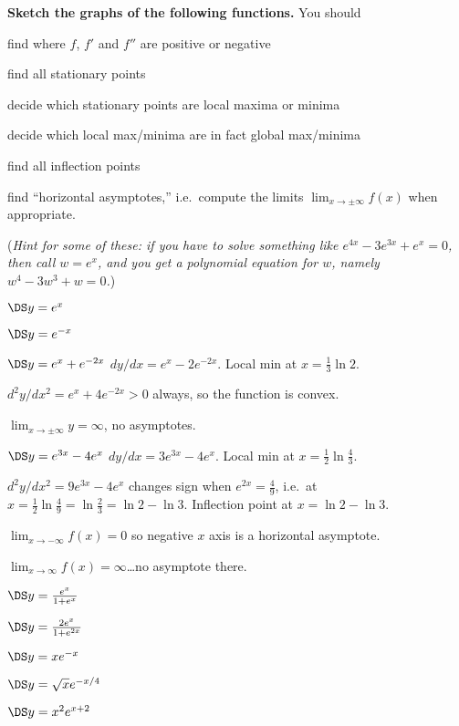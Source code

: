 \begin{multicols}{2}
\noindent\textbf{Sketch the graphs of the following functions.}
You should
\begin{list}{--}{
    \setlength{\itemindent}{0pt}
    \setlength{\leftmargin}{6pt}}
\item find where $f$, $f'$ and $f''$ are positive or negative
\item find all stationary points
\item decide which stationary points are local maxima or minima
\item decide which local max/minima are in fact global max/minima
\item find all inflection points
\item find ``horizontal asymptotes,'' i.e.\ compute the limits
  $\lim_{x\to\pm\infty}f(x)$ when appropriate.
\end{list}


(\textit{Hint for some of these:  if you have to solve something like
  $e^{4x}-3e^{3x}+e^x = 0$, then call $w=e^x$, and you get a polynomial
  equation for $w$, namely $w^4-3w^3+w=0$.})

\problem $\DS y= e^x $

\problem $\DS y= e^{-x} $

\problem $\DS y= e^{x}+e^{-2x} $
\answer
$dy/dx = e^x - 2e^{-2x}$. Local min at $x = \frac13 \ln 2$.

$d^2y/dx^2 = e^x+4e^{-2x}>0$ always, so the function is convex.

$\lim_{x\to\pm\infty} y=\infty$, no asymptotes.
\endanswer

\problem $\DS y= e^{3x}-4e^x $
\answer
$dy/dx = 3e^{3x} - 4 e^x$. Local min at $x=\frac12\ln\frac43$.

$d^2y/dx^2 = 9e^{3x} - 4e^{x}$ changes sign when $e^{2x} = \frac49$,
i.e.~at $x=\frac12\ln\frac49 = \ln\frac23 = \ln2-\ln3$.  Inflection
point at $x=\ln2-\ln 3$.

$\lim_{x\to-\infty}f(x) = 0$ so negative $x$ axis is a horizontal
asymptote.

$\lim_{x\to\infty}f(x) = \infty$\ldots no asymptote there.
\endanswer

\problem $\DS y= \frac{e^x}{1+e^x} $

\problem $\DS y= \frac{2e^x}{1+e^{2x}} $

\problem $\DS y= xe^{-x} $

\problem $\DS y= \sqrt{x}e^{-x/4} $

\problem $\DS y= x^2 e^{x+2} $


\end{multicols}
